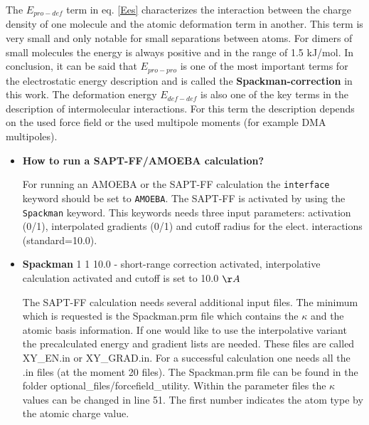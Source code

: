 \documentclass[10pt,a4paper]{article} %
\begin{document}
The $E_{pro-def}$ term in eq. \ref{Ees} characterizes the interaction
between the charge density of one molecule and the atomic deformation
term in another. This term is very small and only notable for small
separations between atoms. For dimers of small molecules the energy
is always positive and in the range of 1.5 kJ/mol. In conclusion,
it can be said that $E_{pro-pro}$ is one of the most important terms
for the electrostatic energy description and is called the \textbf{Spackman-correction}
in this work. The deformation energy $E_{def-def}$ is also one of
the key terms in the description of intermolecular interactions. For
this term the description depends on the used force field or the used
multipole moments (for example DMA multipoles).\\

\begin{itemize}
	\item \textbf{How to run a SAPT-FF/AMOEBA calculation?}
	
	For running an AMOEBA or the SAPT-FF calculation the \texttt{interface} keyword should be set to \texttt{AMOEBA}. The SAPT-FF is activated by using the \texttt{Spackman} keyword. This keywords needs three input parameters: activation (0/1), interpolated gradients (0/1) and cutoff radius for the elect. interactions (standard=10.0).
	
	\item \textbf{Spackman} 1 1 10.0 - short-range correction activated, interpolative calculation activated and cutoff is set to 10.0 $\AA$
	
	The SAPT-FF calculation needs several additional input files. The minimum which is requested is the Spackman.prm file which contains the $\kappa$ and the atomic basis information. If one would like to use the interpolative variant the precalculated energy and gradient lists are needed. These files are called XY\_EN.in or XY\_GRAD.in. For a successful calculation one needs all the .in files (at the moment 20 files). The Spackman.prm file can be found in the folder \glqq optional\_files/forcefield\_utility\grqq. Within the parameter files the $\kappa$ values can be changed in line 51. The first number indicates the atom type by the atomic charge value.
	
	
\end{itemize}


\end{document}

